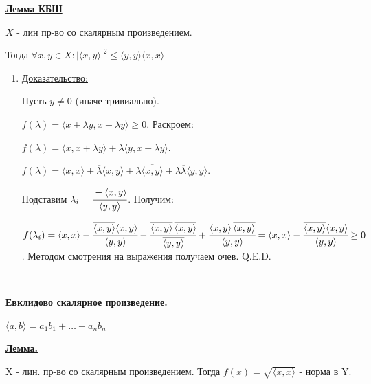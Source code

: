 \documentclass{article}
\newcommand{\thmm}[1]{\underline{\textbf{#1}}}
\begin{document}
    \thmm{Лемма КБШ}
    
    $X$ - лин пр-во со скалярным произведением.

    Тогда $\forall x,y \in X: |\langle x,y \rangle|^2\leq \langle y,y \rangle \langle x,x\rangle$

    \begin{enumerate}
        \item[] \uline{Доказательство:}

        Пусть $y\neq 0$ (иначе тривиально).

        $f(\lambda) = \langle x+\lambda y, x + \lambda y \rangle \geq 0.$ Раскроем:

        $f(\lambda) = \langle x, x+\lambda y \rangle + \lambda\langle y, x+\lambda y \rangle$.

          $f(\lambda) = \langle x, x \rangle+ \overline{\lambda}\langle x,  y \rangle + \lambda \overline{\langle x, y\rangle} +  \lambda \overline{\lambda} \langle y, y\rangle $.

        Подставим $\lambda_i = \cfrac{-\langle x,y \rangle}{\langle y,y \rangle}$. Получим:

        $f(\lambda_i)= \langle x,x \rangle - \cfrac{\overline{\langle x,y \rangle} \langle x,y\rangle}{\langle y,y \rangle} - \cfrac{\overline{\langle x,y \rangle} \, \overline{\langle x,y\rangle}}{\overline{\langle y,y \rangle}} + \cfrac{\langle x,y \rangle \, \overline{\langle x,y\rangle}}{\langle y,y \rangle} =  \langle x,x \rangle - \cfrac{\overline{\langle x,y \rangle} \langle x,y\rangle}{\langle y,y \rangle} \geq 0$. Методом смотрения на выражения получаем очев. Q.E.D.
    \end{enumerate}
    
    \,
    
    \textbf{Евклидово скалярное произведение.} 

    $\langle a,b\rangle = a_1 b_1 + \ldots + a_n b_n$

    \thmm{Лемма.} 

    X - лин. пр-во со скалярным произведением.  Тогда $f(x) = \sqrt{\langle x,x \rangle}$ - норма в Y.
\end{document}
